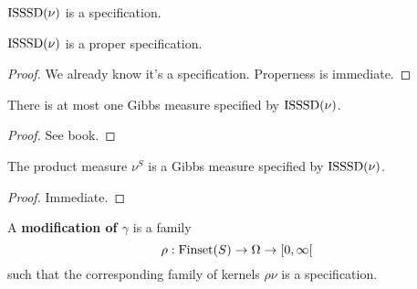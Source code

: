 \begin{definition}
    \label{def:isssd-specification}
    \leanok

    $\operatorname{ISSSD}(\nu)$ is a specification.
\end{definition}

\begin{lemma}
    \label{lem:isssd-proper-specification}
    \leanok

    $\operatorname{ISSSD}(\nu)$ is a proper specification.
\end{lemma}
\begin{proof}

    We already know it's a specification. Properness is immediate.
\end{proof}

\begin{lemma}
    \label{lem:gibbs-measure-uniqueness}

    There is at most one Gibbs measure specified by $\operatorname{ISSSD}(\nu)$.
\end{lemma}
\begin{proof}

    See book.
\end{proof}

\begin{lemma}
    \label{lem:gibbs-measure-existence}

    The product measure $\nu^S$ is a Gibbs measure specified by $\operatorname{ISSSD}(\nu)$.
\end{lemma}
\begin{proof}

   Immediate.
\end{proof}

\begin{definition}[Modification]
    \label{def:modification}
    \leanok

    A {\bf modification of $\gamma$} is a family
    $$\rho : \operatorname{Finset}(S) \to \Omega \to [0, \infty[$$
    such that the corresponding family of kernels $\rho\nu$ is a specification.
\end{definition}

